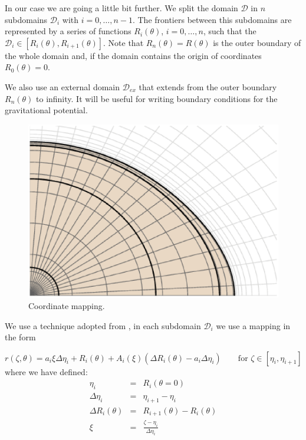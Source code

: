 In our case we are going a little bit further. We split
the domain $\mathcal{D}$ in $n$ subdomains $\mathcal{D}_i$ with
$i=0,\ldots,n-1$. The frontiers between this subdomains are represented
by a series of functions $R_i(\theta)$, $i=0,\ldots,n$, such that
the $\mathcal{D}_i\in[R_{i}(\theta),R_{i+1}(\theta)]$.  Note that
$R_n(\theta)=R(\theta)$ is the outer boundary of the whole domain and,
if the domain contains the origin of coordinates $R_0(\theta)=0$.

We also use an external domain $\mathcal{D}_{ex}$ that extends from the
outer boundary $R_n(\theta)$ to infinity. It will be useful for writing
boundary conditions for the gravitational potential.

\begin{figure}[t]
\centering
\includegraphics[width=0.8\linewidth]{fig/mapping.ps}
\caption{Coordinate mapping.}
\end{figure}


We use a technique adopted from \cite{BGM98}, in each subdomain
$\mathcal{D}_i$ we use a mapping in the form

\begin{equation}
\label{eq:map}
r(\zeta,\theta)=a_i\xi\Delta\eta_i+R_i(\theta)+A_i(\xi)(\Delta R_i(\theta)-a_i\Delta\eta_i) 
\qquad \mbox{for $\zeta\in[\eta_i,\eta_{i+1}]$}
\end{equation}
where we have defined:
\begin{eqnarray*}
\eta_i&=&R_i(\theta=0)\\
\Delta\eta_i&=&\eta_{i+1}-\eta_i\\
\Delta R_i(\theta)&=&R_{i+1}(\theta)-R_{i}(\theta)\\
\xi&=&\displaystyle\frac{\zeta-\eta_i}{\Delta\eta_i}
\end{eqnarray*} 

